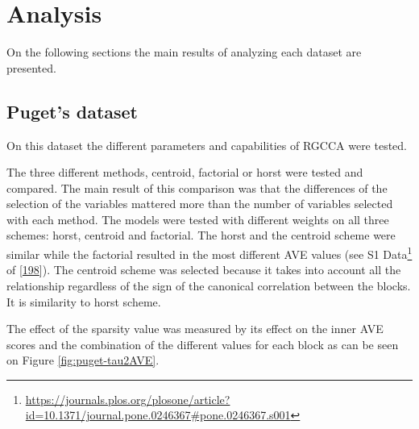 \documentclass[
  12pt,
  a4paper,
  twoside,
  openright]{book}
\DeclareRobustCommand{\href}[2]{#2\footnote{\url{#1}}}
\begin{document}
\hypertarget{analysis}{%
\section{Analysis}\label{analysis}}

On the following sections the main results of analyzing each dataset are presented.

\hypertarget{results-puget}{%
\subsection{Puget's dataset}\label{results-puget}}

On this dataset the different parameters and capabilities of RGCCA were tested.

The three different methods, centroid, factorial or horst were tested and compared.
The main result of this comparison was that the differences of the selection of the variables mattered more than the number of variables selected with each method.
The models were tested with different weights on all three schemes: horst, centroid and factorial.
The horst and the centroid scheme were similar while the factorial resulted in the most different AVE values (see \href{https://journals.plos.org/plosone/article?id=10.1371/journal.pone.0246367\#pone.0246367.s001}{S1 Data} of {[}\protect\hyperlink{ref-revilla2021}{198}{]}).
The centroid scheme was selected because it takes into account all the relationship regardless of the sign of the canonical correlation between the blocks.
It is similarity to horst scheme.

The effect of the sparsity value was measured by its effect on the inner AVE scores and the combination of the different values for each block as can be seen on Figure \ref{fig:puget-tau2AVE}.
\end{document}
